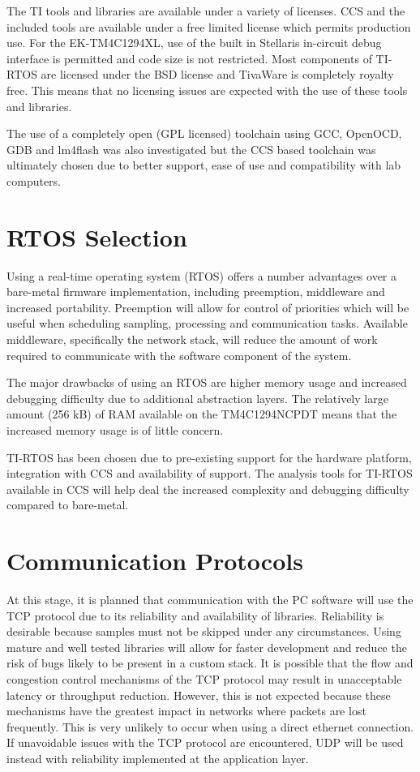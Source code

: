 \documentclass[12pt]{report}
\begin{document}
The TI tools and libraries are available under a variety of licenses. CCS and the included tools are available under a free limited license which permits production use. For the EK-TM4C1294XL, use of the built in Stellaris in-circuit debug interface is permitted and code size is not restricted. Most components of TI-RTOS are licensed under the BSD license and TivaWare is completely royalty free. This means that no licensing issues are expected with the use of these tools and libraries.

The use of a completely open (GPL licensed) toolchain using GCC, OpenOCD, GDB and lm4flash was also investigated but the CCS based toolchain was ultimately chosen due to better support, ease of use and compatibility with lab computers.

\section{RTOS Selection}
Using a real-time operating system (RTOS) offers a number advantages over a bare-metal firmware implementation, including preemption, middleware and increased portability\cite{RTOSorBM}. Preemption will allow for control of priorities which will be useful when scheduling sampling, processing and communication tasks. Available middleware, specifically the network stack, will reduce the amount of work required to communicate with the software component of the system.

The major drawbacks of using an RTOS are higher memory usage and increased debugging difficulty due to additional abstraction layers. The relatively large amount (256 kB) of RAM available on the TM4C1294NCPDT means that the increased memory usage is of little concern.

TI-RTOS has been chosen due to pre-existing support for the hardware platform, integration with CCS and availability of support. The analysis tools for TI-RTOS available in CCS will help deal the increased complexity and debugging difficulty compared to bare-metal.

\section{Communication Protocols}
At this stage, it is planned that communication with the PC software will use the TCP protocol due to its reliability and availability of libraries. Reliability is desirable because samples must not be skipped under any circumstances. Using mature and well tested libraries will allow for faster development and reduce the risk of bugs likely to be present in a custom stack. It is possible that the flow and congestion control mechanisms of the TCP protocol may result in unacceptable latency or throughput reduction. However, this is not expected because these mechanisms have the greatest impact in networks where packets are lost frequently\cite{RTOSorBM}. This is very unlikely to occur when using a direct ethernet connection. If unavoidable issues with the TCP protocol are encountered, UDP will be used instead with reliability implemented at the application layer.
\end{document}
